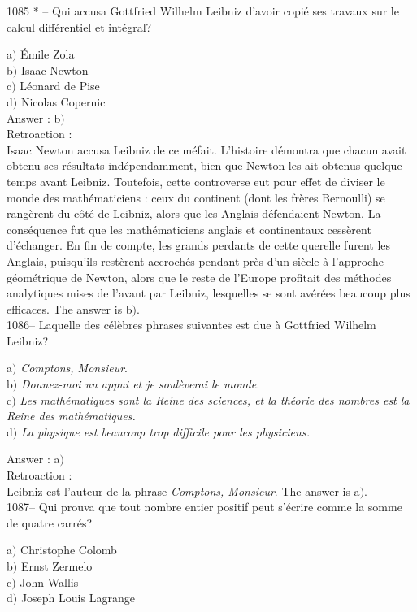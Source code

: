 ﻿\documentclass[letterpaper, 12pt]{article}
\begin{document}
1085 * -- Qui accusa Gottfried Wilhelm Leibniz d'avoir copi\'e ses
travaux sur le calcul diff\'erentiel et int\'egral?

a$)$ \'Emile Zola \\
b$)$ Isaac Newton \\
c$)$ L\'eonard de Pise \\
d$)$ Nicolas Copernic  \\

Answer : b$)$\\

Retroaction : \\
Isaac Newton accusa Leibniz de ce m\'efait. L'histoire d\'emontra
que chacun avait obtenu ses r\'esultats ind\'ependam\-ment, bien que
Newton les ait obtenus quelque temps avant Leibniz. Toutefois, cette
controverse eut pour effet de diviser le monde des math\'ematiciens
: ceux du continent (dont les fr\`eres Bernoulli) se rang\`erent du
c\^ot\'e de Leibniz, alors que les Anglais d\'efendaient Newton. La
cons\'equence fut que les math\'ematiciens anglais et continentaux
cess\`erent d'\'echanger. En fin de compte, les grands perdants de
cette querelle furent les Anglais, puisqu'ils rest\`erent
accroch\'es pendant pr\`es d'un si\`ecle \`a l'approche
g\'eom\'etrique de Newton, alors que le reste de l'Europe profitait
des m\'ethodes analytiques mises de l'avant par Leibniz, lesquelles
se sont av\'er\'ees beaucoup plus efficaces.
The answer is b$)$.\\

1086-- Laquelle des c\'el\`ebres phrases suivantes est due \`a
Gottfried Wilhelm Leibniz?

a$)$ {\sl Comptons, Monsieur}. \\
b$)$ {\sl Donnez-moi un appui et je soul\`everai le monde.} \\
c$)$ {\sl Les math\'ematiques sont la Reine des sciences, et la th\'eorie
des nombres est la Reine des math\'ematiques.} \\
d$)$ {\sl La physique est beaucoup trop difficile pour les physiciens.}

Answer : a$)$\\

Retroaction : \\
Leibniz est l'auteur de la phrase {\sl Comptons, Monsieur}.
The answer is a$)$.\\

1087-- Qui prouva que tout nombre entier positif peut s'\'ecrire
comme la somme de quatre carr\'es?

a$)$ Christophe Colomb \\
b$)$ Ernst Zermelo \\
c$)$ John Wallis \\
d$)$ Joseph Louis Lagrange\\
\end{document}
